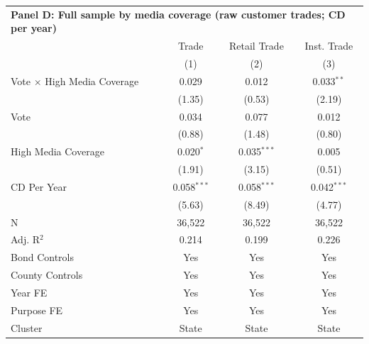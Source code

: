 \begingroup
\centering
\begin{tabular*}{\textwidth}{@{\extracolsep{\fill}}lccc}
\multicolumn{5}{l}{\textbf{Panel D: Full sample by media coverage (raw customer trades; CD per year)}}\\

\addlinespace
   \toprule
                                      & Trade         & Retail Trade  & Inst. Trade\\  
                                      & (1)           & (2)           & (3)\\  
   \midrule 
   Vote $\times$ High Media Coverage  & 0.029         & 0.012         & 0.033$^{**}$\\   
                                      & (1.35)       & (0.53)       & (2.19)\\   
   Vote                               & 0.034         & 0.077         & 0.012\\   
                                      & (0.88)       & (1.48)       & (0.80)\\   
   High Media Coverage                & 0.020$^{*}$   & 0.035$^{***}$ & 0.005\\   
                                      & (1.91)       & (3.15)       & (0.51)\\   
   CD Per Year                        & 0.058$^{***}$ & 0.058$^{***}$ & 0.042$^{***}$\\   
                                      & (5.63)       & (8.49)       & (4.77)\\   
   \hline
   N                       & 36,522        & 36,522        & 36,522\\  
   Adj. R$^2$                     & 0.214         & 0.199         & 0.226\\  
   Bond Controls                      & Yes           & Yes           & Yes\\  
   County Controls                    & Yes           & Yes           & Yes\\  
   Year FE                            & Yes           & Yes           & Yes\\  
   Purpose FE                         & Yes           & Yes           & Yes\\  
   Cluster              & State & State & State\\  
   \bottomrule
\end{tabular*}
\par\endgroup

